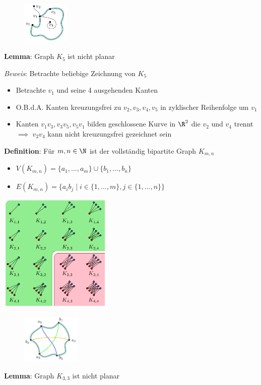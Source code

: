 \begin{figure}
	\centering
	\vspace{-40pt}
	\includegraphics[width=0.2\textwidth]{images/k5-p.png}
	\vspace{40pt}
	\vspace{-120pt}
\end{figure}
\textbf{Lemma}: Graph $K_5$ ist nicht planar

\textit{Beweis}: Betrachte beliebige Zeichnung von $K_5$
\begin{itemize}
	\item Betrachte $v_1$ und seine 4 ausgehenden Kanten
	\item O.B.d.A. Kanten kreuzungsfrei zu $v_2,v_3,v_4,v_5$ in zyklischer Reihenfolge um $v_1$
	\item Kanten $v_1v_3, v_3v_5, v_5v_1$ bilden geschlossene Kurve in $\R^2$ die $v_2$ und $v_4$ trennt $\implies$ $v_2v_4$ kann nicht kreuzungsfrei gezeichnet sein
\end{itemize}
\bigskip
\textbf{Definition}: Für $m,n\in\N$ ist der vollständig bipartite Graph $K_{m,n}$
\begin{itemize}
	\item $V(K_{m,n})=\{a_1,\ldots,a_m\}\cup\{b_1,\ldots,b_n\}$
	\item $E(K_{m,n})=\{a_ib_j \mid i \in\{1, \ldots, m\}, j \in\{1, \ldots,n\}\}$
\end{itemize}
\begin{center}
	\includegraphics[width=0.4\textwidth]{images/bg.png}
\end{center}

\begin{figure}
	\centering
	\includegraphics[width=0.25\textwidth]{images/k33-p.png}
	\vspace{-50pt}
\end{figure}
\textbf{Lemma}: Graph $K_{3,3}$ ist nicht planar

